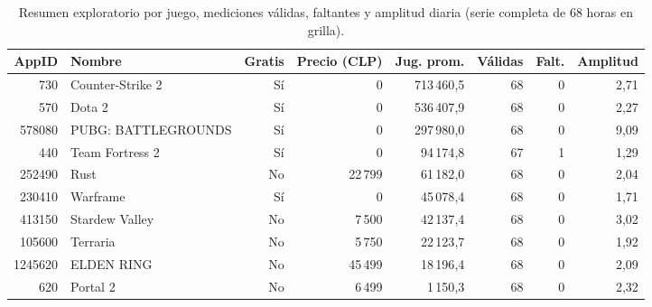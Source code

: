 \documentclass[11pt,a4paper]{article}
\begin{document}
\begin{table}[H]
\centering
\caption{Resumen exploratorio por juego, mediciones válidas, faltantes y amplitud diaria (serie completa de 68 horas en grilla).}
\label{tab:exploracion}
\small
\begin{tabular}{@{}rlrrrrrr@{}}
\toprule
\textbf{AppID} & \textbf{Nombre} & \textbf{Gratis} & \textbf{Precio (CLP)} & \textbf{Jug. prom.} & \textbf{Válidas} & \textbf{Falt.} & \textbf{Amplitud} \\
\midrule
730     & Counter-Strike 2    & Sí & 0      & 713\,460{,}5 & 68 & 0 & 2{,}71 \\
570     & Dota 2              & Sí & 0      & 536\,407{,}9 & 68 & 0 & 2{,}27 \\
578080  & PUBG: BATTLEGROUNDS & Sí & 0      & 297\,980{,}0 & 68 & 0 & 9{,}09 \\
440     & Team Fortress 2     & Sí & 0      &  94\,174{,}8 & 67 & 1 & 1{,}29 \\
252490  & Rust                & No & 22\,799 &  61\,182{,}0 & 68 & 0 & 2{,}04 \\
230410  & Warframe            & Sí & 0      &  45\,078{,}4 & 68 & 0 & 1{,}71 \\
413150  & Stardew Valley      & No &  7\,500 &  42\,137{,}4 & 68 & 0 & 3{,}02 \\
105600  & Terraria            & No &  5\,750 &  22\,123{,}7 & 68 & 0 & 1{,}92 \\
1245620 & ELDEN RING          & No & 45\,499 &  18\,196{,}4 & 68 & 0 & 2{,}09 \\
620     & Portal 2            & No &  6\,499 &   1\,150{,}3 & 68 & 0 & 2{,}32 \\
\bottomrule
\end{tabular}
\end{table}
\end{document}
